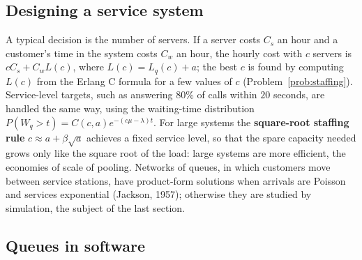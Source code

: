 \documentclass[11pt,a4paper]{article}
\numberwithin{equation}{section}
\theoremstyle{definition}
\begin{document}
\subsection{Designing a service system}
\label{ssec:queuedesign}

A typical decision is the number of servers. If a server costs $C_s$ an hour and a customer's time in the system costs $C_w$ an hour, the hourly cost with $c$ servers is $cC_s + C_wL(c)$, where $L(c) = L_q(c) + a$; the best $c$ is found by computing $L(c)$ from the Erlang C formula for a few values of $c$
(Problem~\ref{prob:staffing}). Service-level targets, such as answering $80\%$ of calls within $20$ seconds, are handled the same way, using the waiting-time distribution $P(W_q > t) = C(c, a)e^{-(c\mu - \lambda)t}$. For large systems the \textbf{square-root staffing rule} $c \approx a + \beta\sqrt a$ achieves a fixed service level, so that the
spare capacity needed grows only like the square root of the load: large systems are more efficient, the economies of scale of pooling. Networks of queues, in which customers move between service stations, have product-form solutions when arrivals are Poisson and services exponential (Jackson, 1957); otherwise they are studied by simulation, the subject of the last section.

\subsection{Queues in software}
\label{ssec:software14}
\end{document}
